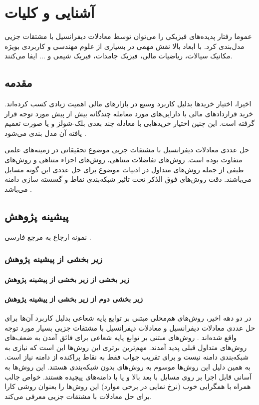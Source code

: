 % 
\chapter{آشنایی و کلیات}


عموما رفتار پدیده‌های فیزیکی را می‌توان توسط معادلات دیفرانسیل با مشتقات جزیی مدل‌بندی کرد. 
با ابعاد بالا نقش مهمی در بسیاری از علوم مهندسی و کاربردی بویژه مکانیک سیالات، ریاضیات مالی، فیزیک جامدات، فیریک شیمی و ... ایفا می‌کنند.
\section{مقدمه}
اخیرا، اختیار خریدها بدلیل کاربرد وسیع‌ در بازارهای مالی اهمیت زیادی کسب کرده‌اند. خرید قراردادهای مالی با دارایی‌های مورد معامله چندگانه بیش از پیش مورد توجه قرار گرفته است. این چنین اختیار خریدهایی با معادله چند بعدی بلک-شولز
و یا صورت تعمیم یافته آن مدل بندی می‌شود
\citep{Zvan,Kwok}.

حل عددی معادلات دیفرانسیل با مشتقات جزیی موضوع تحقیقاتی در زمینه‌های علمی متفاوت بوده است. روش‌های تفاضلات متناهی، روش‌های اجزاء متناهی
و روش‌های طیفی  
از جمله روش‌های متداول در ادبیات موضوع برای حل عددی این گونه مسایل می‌باشند. دقت روش‌های فوق الذکر تحت تاثیر شبکه‌بندی نقاط و گسسته سازی دامنه می‌باشد
\citep{Larsson}.

\section{پیشینه پژوهش}
نمونه ارجاع به مرجع فارسی 
\citep{Vahedi87}.
\subsection{زير بخشی از پیشینه پژوهش}

\subsubsection{زير بخشی از زير بخشی از پیشینه پژوهش}

\subsubsection{زير بخشی دوم از زير بخشی از پیشینه پژوهش}
در دو دهه اخیر، روش‌های هم‌محلی مبتنی بر توابع پایه شعاعی بدلیل کاربرد آن‌ها برای حل عددی معادلات دیفرانسیل و معادلات دیفرانسیل با مشتقات جزیی بسیار مورد توجه واقع شده‌اند
\citep{Platte,Wu,Larsson}.
روش‌های مبتنی بر توابع پایه شعاعی  برای فائق آمدن به ضعف‌های روش‌های متداول قبلی پدید آمدند. مهم‌ترین برتری این روش‌ها این است که نیازی به شبکه‌بندی دامنه نیست و برای تقریب جواب فقط به نقاط پراکنده از دامنه نیاز است. به همین دلیل این روش‌ها موسوم به روش‌های بدون شبکه‌بندی هستند. این روش‌ها به آسانی قابل اجرا بر روی مسایل با بعد بالا و یا با دامنه‌های پیچیده هستند. خواص جالب همراه با همگرایی خوب  (نرخ نمایی در برخی موارد) این روش‌ها را بعنوان روشی کارا برای حل معادلات با مشتقات جزیی معرفی می‌کند.

